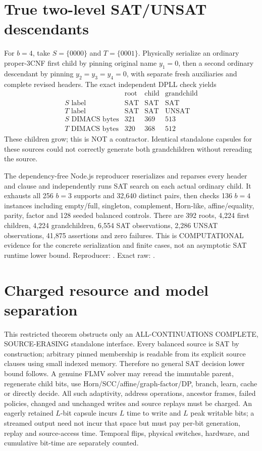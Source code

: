 \documentclass[11pt]{article}
\begin{document}
\section{True two-level SAT/UNSAT descendants}
For $b=4$, take $S=\{0000\}$ and
$T=\{0001\}$. Physically serialize an
ordinary proper-3CNF first child by pinning
original name $y_1=0$, then a second
ordinary descendant by pinning
$y_2=y_3=y_4=0$, with separate fresh
auxiliaries and complete revised headers.
The exact independent DPLL check yields
\[
\begin{array}{c|ccc}
&\mathrm{root}&\mathrm{child}&\mathrm{grandchild}\\\hline
S\text{ label}&\mathrm{SAT}&\mathrm{SAT}&\mathrm{SAT}\\
T\text{ label}&\mathrm{SAT}&\mathrm{SAT}&\mathrm{UNSAT}\\
S\text{ DIMACS bytes}&321&369&513\\
T\text{ DIMACS bytes}&320&368&512
\end{array}
\]
These children grow; this is NOT a contractor.
Identical standalone capsules for these
sources could not correctly generate both
grandchildren without rereading the source.

The dependency-free Node.js reproducer reserializes
and reparses every header and clause and independently
runs SAT search on each actual ordinary child.
It exhausts all 256 $b=3$ supports and 32,640
distinct pairs, then checks 136 $b=4$
instances including empty/full, singleton,
complement, Horn-like, affine/equality, parity,
factor and 128 seeded balanced controls.
There are 392 roots, 4,224 first children,
4,224 grandchildren, 6,554 SAT observations,
2,286 UNSAT observations, 41,875
assertions and zero failures. This is
COMPUTATIONAL evidence for the concrete
serialization and finite cases, not an
asymptotic SAT runtime lower bound.
Reproducer:
.
Exact raw:
.

\section{Charged resource and model separation}
This restricted theorem obstructs only an
ALL-CONTINUATIONS COMPLETE, SOURCE-ERASING
standalone interface. Every balanced source
is SAT by construction; arbitrary pinned
membership is readable from its explicit
source clauses using small indexed memory.
Therefore no general SAT decision lower
bound follows. A genuine FLMV solver may
reread the immutable parent, regenerate
child bits, use Horn/SCC/affine/graph-factor/DP,
branch, learn, cache or directly decide.
All such adaptivity, address operations,
ancestor frames, failed policies, changed
and unchanged writes and source replays must
be charged. An eagerly retained $L$-bit
capsule incurs $L$ time to write and $L$
peak writable bits; a streamed output need
not incur that space but must pay per-bit
generation, replay and source-access time.
Temporal flips, physical switches, hardware,
and cumulative bit-time are separately counted.
\end{document}
